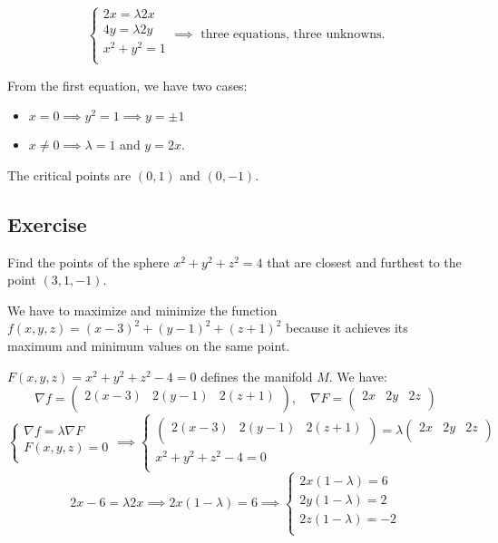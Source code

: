 \documentclass[11pt]{article}
\begin{document}
\[
\begin{cases}
    2x = \lambda 2x \\
    4y = \lambda 2y \\
    x^2 + y^2 = 1 \\
\end{cases} \implies \text{ three equations, three unknowns.}
\]

From the first equation, we have two cases:
\begin{itemize}
    \item $x = 0 \implies y^2 = 1 \implies y = \pm 1$
    \item $x \neq 0 \implies \lambda = 1$ and $y = 2x$.
    \end{itemize}

The critical points are $(0,1)$ and $(0,-1)$.

\subsection*{Exercise}
Find the points of the sphere $x^2 + y^2 + z^2 = 4$ that are closest and furthest to the point $(3,1,-1)$.

We have to maximize and minimize the function $f(x,y,z) = (x - 3)^2 + (y - 1)^2 + (z + 1)^2$ because it achieves its maximum and minimum values on the same point. 

$F(x,y,z) = x^2 + y^2 + z^2 - 4 = 0$ defines the manifold $M$. We have:
\[
\nabla f = \begin{pmatrix}
    2(x - 3) & 2(y - 1) & 2(z + 1) \\
\end{pmatrix}, \quad \nabla F = \begin{pmatrix}
    2x & 2y & 2z \\
\end{pmatrix}
\]
\[
\begin{cases}
    \nabla f = \lambda \nabla F \\
    F(x,y,z) = 0 \\
\end{cases} \implies \begin{cases}
    \begin{pmatrix}
        2(x - 3) & 2(y - 1) & 2(z + 1) \\
    \end{pmatrix} = \lambda \begin{pmatrix}
        2x & 2y & 2z \\
    \end{pmatrix} \\
    x^2 + y^2 + z^2 - 4 = 0 \\  
\end{cases}
\]
\[
2x - 6 = \lambda 2x \implies 2x (1 - \lambda) = 6 \implies \begin{cases}
    2x (1 - \lambda) = 6 \\
    2y (1 - \lambda) = 2 \\
    2z (1 - \lambda) = -2 \\
\end{cases}
\]
\end{document}

